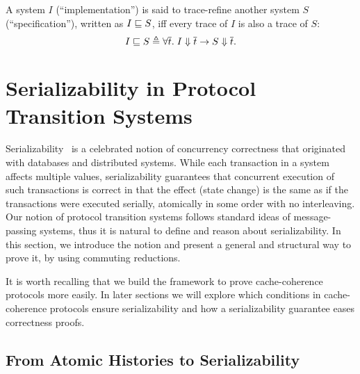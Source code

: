 \documentclass[sigplan,10pt,review,anonymous,screen]{acmart}\settopmatter{printfolios=true,printccs=false,printacmref=false}
\begin{document}
\begin{definition}
  A system $I$ (``implementation'') is said to trace-refine another system $S$
  (``specification''), written as $I \sqsubseteq S$, iff every trace of $I$ is
  also a trace of $S$:
  \begin{displaymath}
    I \sqsubseteq S \triangleq \forall \overline{t}.\; I \Downarrow \overline{t} \to S \Downarrow \overline{t}.
  \end{displaymath}
\end{definition}

\section{Serializability in Protocol Transition Systems}
\label{sec-sz-in-hemiola}

Serializability~\cite{sz1,sz2} is a celebrated notion of concurrency correctness that originated with databases and distributed systems.
While each transaction in a system affects multiple values, serializability guarantees that concurrent execution of such transactions is correct in that the effect (state change) is the same as if the transactions were executed serially, \ie{} atomically in some order with no interleaving.
Our notion of protocol transition systems follows standard ideas of message-passing systems, thus it is natural to define and reason about serializability.
In this section, we introduce the notion and present a general and structural way to prove it, by using commuting reductions.

It is worth recalling that we build the framework to prove cache-coherence protocols more easily.
In later sections we will explore which conditions in cache-coherence protocols ensure serializability and how a serializability guarantee eases correctness proofs.

\subsection{From Atomic Histories to Serializability}
\end{document}
